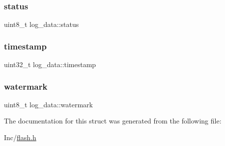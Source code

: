 \mbox{\label{structlog__data_aad2793af491536409cd64e2b4ae1893a}} 
\subsubsection{\texorpdfstring{status}{status}}
{\footnotesize\ttfamily uint8\+\_\+t log\+\_\+data\+::status}

\mbox{\label{structlog__data_acbe3ab92c413e2d8bdfecd0f2bafdd6b}} 
\subsubsection{\texorpdfstring{timestamp}{timestamp}}
{\footnotesize\ttfamily uint32\+\_\+t log\+\_\+data\+::timestamp}

\mbox{\label{structlog__data_a0ba4ca998bb81e9da248dbb13e633ddf}} 
\subsubsection{\texorpdfstring{watermark}{watermark}}
{\footnotesize\ttfamily uint8\+\_\+t log\+\_\+data\+::watermark}



The documentation for this struct was generated from the following file\+:\begin{DoxyCompactItemize}
\item 
Inc/\hyperlink{flash_8h}{flash.\+h}\end{DoxyCompactItemize}
